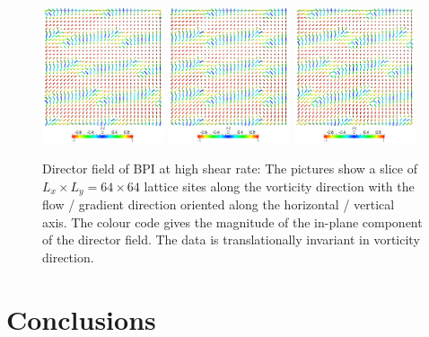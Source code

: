\documentclass[aps,pre,reprint,superscriptaddress, twocolumn]{revtex4}
\begin{document}
\begin{figure}[ht]
\includegraphics[width=0.32\textwidth]{dir+z-300k_run916.png}
\includegraphics[width=0.32\textwidth]{dir+z-301k_run916.png}
\includegraphics[width=0.32\textwidth]{dir+z-302k_run916.png}
\caption{Director field of BPI at high shear rate: The pictures show a slice of $L_x\times L_y = 64\times64$ lattice sites along the vorticity direction with the flow / gradient direction oriented along the horizontal / vertical axis. The colour code gives the magnitude of the in-plane component of the director field. The data is translationally invariant in vorticity direction.}
\label{bp1-high}
\end{figure}
 



\clearpage

\section{Conclusions}

\end{document}
